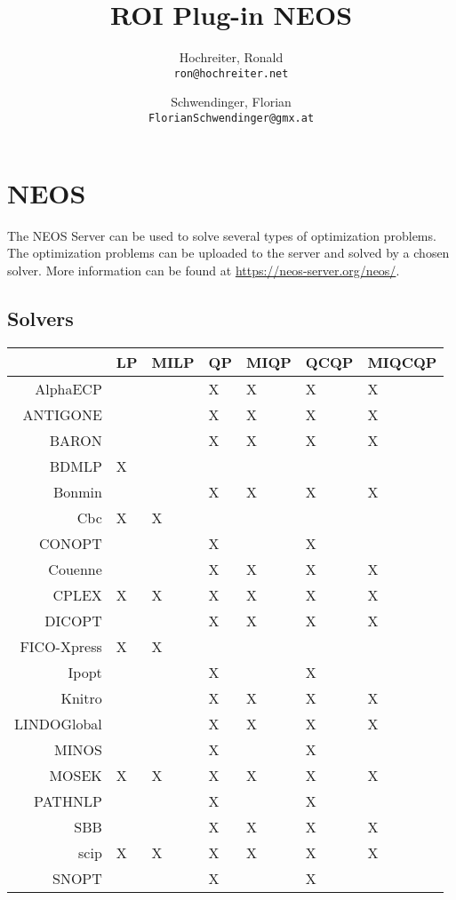 \documentclass[a4paper]{article}\usepackage[]{graphicx}\usepackage[]{color}
\author{
    Hochreiter, Ronald\\
    \texttt{ron@hochreiter.net}
    \and 
    Schwendinger, Florian\\
    \texttt{FlorianSchwendinger@gmx.at}
}
\title{ROI Plug-in NEOS}
\begin{document}
\sloppy
\maketitle

\tableofcontents

\newpage

\section{NEOS}
The NEOS Server can be used to solve several types of optimization problems.
The optimization problems can be uploaded to the server and solved 
by a chosen solver. More information can be found at 
\url{https://neos-server.org/neos/}.

\subsection{Solvers}
\begin{center}
\begin{table}[ht]
\centering
\begin{tabular}{rllllll}
  \hline
 & LP & MILP & QP & MIQP & QCQP & MIQCQP \\ 
  \hline
AlphaECP &  &  & X & X & X & X \\ 
  ANTIGONE &  &  & X & X & X & X \\ 
  BARON &  &  & X & X & X & X \\ 
  BDMLP & X &  &  &  &  &  \\ 
  Bonmin &  &  & X & X & X & X \\ 
  Cbc & X & X &  &  &  &  \\ 
  CONOPT &  &  & X &  & X &  \\ 
  Couenne &  &  & X & X & X & X \\ 
  CPLEX & X & X & X & X & X & X \\ 
  DICOPT &  &  & X & X & X & X \\ 
  FICO-Xpress & X & X &  &  &  &  \\ 
  Ipopt &  &  & X &  & X &  \\ 
  Knitro &  &  & X & X & X & X \\ 
  LINDOGlobal &  &  & X & X & X & X \\ 
  MINOS &  &  & X &  & X &  \\ 
  MOSEK & X & X & X & X & X & X \\ 
  PATHNLP &  &  & X &  & X &  \\ 
  SBB &  &  & X & X & X & X \\ 
  scip & X & X & X & X & X & X \\ 
  SNOPT &  &  & X &  & X &  \\ 
   \hline
\end{tabular}
\end{table}

\end{center}
\end{document}
